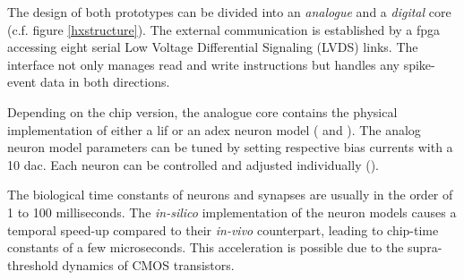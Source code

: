 The design of both prototypes can be divided into an \emph{analogue} and a \emph{digital} core (c.f. figure \ref{hxstructure}). The external communication is established by a \gls{fpga} accessing eight serial Low Voltage Differential Signaling (LVDS) links. The interface not only manages read and write instructions but handles any spike-event data in both directions.

Depending on the chip version, the analogue core contains the physical implementation of either a \gls{lif} or an \gls{adex} neuron model (\citealp{aamir2018dls2neuron} and \citealp{aamir2018mixed}). The analog neuron model parameters can be tuned by setting respective bias currents with a \SI{10}{\bit} \gls{dac}. Each neuron can be controlled and adjusted individually (\citealp{hock13analogmemory}). 

The biological time constants of neurons and synapses are usually in the order of 1 to 100 milliseconds. The \textit{in-silico} implementation of the neuron models causes a temporal speed-up compared to their \textit{in-vivo} counterpart, leading to chip-time constants of a few microseconds. This acceleration is possible due to the supra-threshold dynamics of CMOS transistors. 

